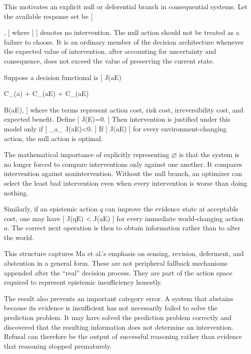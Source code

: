 \documentclass[11pt]{article}
\begin{document}
This motivates an explicit null or deferential branch in consequential systems. Let the available response set be
[

\cup
{}
\cup
{\varnothing},
]
where
[
\varnothing
]
denotes no intervention. The null action should not be treated as a failure to choose. It is an ordinary member of the decision architecture whenever the expected value of intervention, after accounting for uncertainty and consequence, does not exceed the value of preserving the current state.

Suppose a decision functional is
[
J(a\mid E)

C_{}(a)
+
C_{}(a\mid E)
+
C_{}(a\mid E)

B(a\mid E),
]
where the terms represent action cost, risk cost, irreversibility cost, and expected benefit. Define
[
J(\varnothing\mid E)=0.
]
Then intervention is justified under this model only if
[
\min_{a\in{}_{}}
J(a\mid E)<0.
]
If
[
J(a\mid E)
]
for every environment-changing action, the null action is optimal.

The mathematical importance of explicitly representing $\varnothing$ is that the system is no longer forced to compare interventions only against one another. It compares intervention against nonintervention. Without the null branch, an optimizer can select the least bad intervention even when every intervention is worse than doing nothing.

Similarly, if an epistemic action $q$ can improve the evidence state at acceptable cost, one may have
[
J(q\mid E)
<
J(a\mid E)
]
for every immediate world-changing action $a$. The correct next operation is then to obtain information rather than to alter the world.

This structure captures Ma et al.'s emphasis on sensing, revision, deferment, and abstention in a general form. These are not peripheral fallback mechanisms appended after the ``real'' decision process. They are part of the action space required to represent epistemic insufficiency honestly.

The result also prevents an important category error. A system that abstains because its evidence is insufficient has not necessarily failed to solve the prediction problem. It may have solved the prediction problem correctly and discovered that the resulting information does not determine an intervention. Refusal can therefore be the output of successful reasoning rather than evidence that reasoning stopped prematurely.
\end{document}
